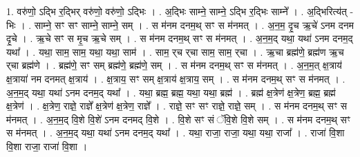 \documentclass[17pt]{extarticle}
\begin{document}
1. वरु॑णो॒ ऽद्भि र॒द्भिर् वरु॑णो॒ वरु॑णो॒ ऽद्भिः । . अ॒द्भिः साम्ने॒ साम्ने॒ ऽद्भि र॒द्भिः साम्ने᳚ । . अ॒द्भिरित्य॑त् - भिः । . साम्ने॒ सꣳ सꣳ साम्ने॒ साम्ने॒ सम् । . स म॑नम दनम॒थ् सꣳ स म॑नमत् । . अ॒न॒म॒ दृ॒च ऋ॒चे॑ ऽनम दनम दृ॒चे । . ऋ॒चे सꣳ स मृ॒च ऋ॒चे सम् । . स म॑नम दनम॒थ् सꣳ स म॑नमत् । . अ॒न॒म॒द् यथा॒ यथा॑ ऽनम दनम॒द् यथा᳚ । . यथा॒ साम॒ साम॒ यथा॒ यथा॒ साम॑ । . साम॒ र्‌च र्‌चा साम॒ साम॒ र्‌चा । . ऋ॒चा ब्रह्म॑णे॒ ब्रह्म॑ण ऋ॒च र्‌चा ब्रह्म॑णे । . ब्रह्म॑णे॒ सꣳ सम् ब्रह्म॑णे॒ ब्रह्म॑णे॒ सम् । . स म॑नम दनम॒थ् सꣳ स म॑नमत् । . अ॒न॒म॒त् क्ष॒त्राय॑ क्ष॒त्राया॑ नम दनमत् क्ष॒त्राय॑ । . क्ष॒त्राय॒ सꣳ सम् क्ष॒त्राय॑ क्ष॒त्राय॒ सम् । . स म॑नम दनम॒थ् सꣳ स म॑नमत् । . अ॒न॒म॒द् यथा॒ यथा॑ ऽनम दनम॒द् यथा᳚ । . यथा॒ ब्रह्म॒ ब्रह्म॒ यथा॒ यथा॒ ब्रह्म॑ । . ब्रह्म॑ क्ष॒त्रेण॑ क्ष॒त्रेण॒ ब्रह्म॒ ब्रह्म॑ क्ष॒त्रेण॑ । . क्ष॒त्रेण॒ राज्ञे॒ राज्ञे᳚ क्ष॒त्रेण॑ क्ष॒त्रेण॒ राज्ञे᳚ । . राज्ञे॒ सꣳ सꣳ राज्ञे॒ राज्ञे॒ सम् । . स म॑नम दनम॒थ् सꣳ स म॑नमत् । . अ॒न॒म॒द् वि॒शे वि॒शे॑ ऽनम दनमद् वि॒शे । . वि॒शे सꣳ सं ॅवि॒शे वि॒शे सम् । . स म॑नम दनम॒थ् सꣳ स म॑नमत् । . अ॒न॒म॒द् यथा॒ यथा॑ ऽनम दनम॒द् यथा᳚ । . यथा॒ राजा॒ राजा॒ यथा॒ यथा॒ राजा᳚ । . राजा॑ वि॒शा वि॒शा राजा॒ राजा॑ वि॒शा । \newline
\end{document}
